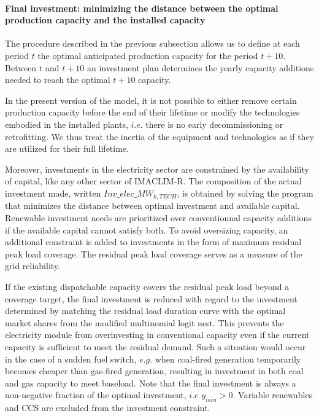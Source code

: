 

\paragraph{Final investment: minimizing the distance between the optimal production capacity and the installed capacity}

The procedure described in the previous subsection allows us to define at each period $t$  the optimal anticipated production capacity for the period $t+10$. Between t and $t+10$ an investment plan determines the yearly capacity additions needed to reach the optimal $t+10$ capacity.

In the present version of the model, it is not possible to either remove certain production capacity before the end of their lifetime or modify the technologies embodied in the installed plants, $i.e.$ there is no early decommissioning or retrofitting. We thus treat the inertia of the equipment and technologies as if they are utilized for their full lifetime.

Moreover, investments in the electricity sector are constrained by the availability of capital, like any other sector of IMACLIM-R. The composition of the actual investment made, written $Inv\_elec\_MW_{k,TECH}$, is obtained by solving the program that minimizes the distance between optimal investment and available capital. Renewable investment needs are prioritized over conventionnal capacity additions if the available capital cannot satisfy both.
To avoid oversizing capacity, an additional constraint is added to investments in the form of maximum residual peak load coverage. The residual peak load coverage serves as a measure of the grid reliability.

If the existing dispatchable capacity covers the residual peak load beyond a coverage target, the final investment is reduced with regard to the investment determined by matching the residual load duration curve with the optimal market shares from the modified multinomial logit nest. This prevents the electricity module from overinvesting in conventional capacity even if the current capacity is sufficient to meet the residual demand. Such a situation would occur in the case of a sudden fuel switch, $e.g.$ when coal-fired generation temporarily becomes cheaper than gas-fired generation, resulting in investment in both coal and gas capacity to meet baseload. Note that the final investment is always a non-negative fraction of the optimal investment, $i.e$ $y_{min} > 0$. Variable renewables and CCS are excluded from the investment constraint.

